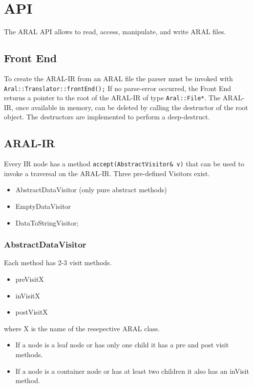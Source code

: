 \chapter{API}

The ARAL API allows to read, access, manipulate, and write ARAL files.

\section{Front End}

To create the ARAL-IR from an ARAL file the parser must be invoked
with \verb+Aral::Translator::frontEnd();+
If no parse-error occurred, the Front End returns a pointer to the
root of the ARAL-IR of type \verb+Aral::File*+.
The ARAL-IR, once available in memory, can be deleted by calling
the destructor of the root object. The destructors are implemented to
perform a deep-destruct.

\section{ARAL-IR}
Every IR node has a method \verb+accept(AbstractVisitor& v)+ that can be used
to invoke a traversal on the ARAL-IR. Three pre-defined Visitors exist.
\begin{itemize}
\item AbstractDataVisitor (only pure abstract methods)
\item EmptyDataVisitor
\item DataToStringVisitor;
\end{itemize}

\subsection{AbstractDataVisitor}

Each method has 2-3 visit methods.

\begin{itemize}
\item preVisitX
\item inVisitX
\item postVisitX
\end{itemize}

where X is the name of the resepective ARAL class.

\begin{itemize}
\item If a node is a leaf node or has only one child it has a pre and post
visit methods.
\item If a node is a container node or has at least two
children it also has an inVisit method.
\end{itemize}

